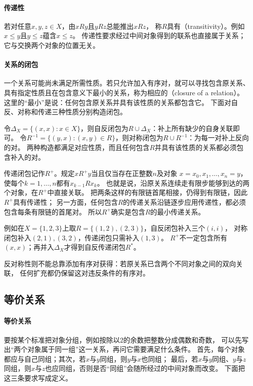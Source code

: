 \paragraph{传递性}
若对任意$x,y,z\in X$，由$xRy$且$yRz$总能推出$xRz$，
称$R$具有（transitivity）。例如$x\leq y$且$y\leq z$蕴含$x\leq z$。
传递性要求经过中间对象得到的联系也直接属于关系；它与交换两个对象的位置无关。

\paragraph{关系的闭包}
一个关系可能尚未满足所需性质。若只允许加入有序对，就可以寻找包含原关系、
具有指定性质且在包含意义下最小的关系，称为相应的（closure of a relation）。
这里的“最小”是说：任何包含原关系并具有该性质的关系都包含它。
下面对自反、对称和传递三种性质分别构造闭包。

令$\Delta_X=\{(x,x):x\in X\}$，则自反闭包为$R\cup\Delta_X$：补上所有缺少的自身关联即可。
令$R^{-1}=\{(y,x):(x,y)\in R\}$，则对称闭包为$R\cup R^{-1}$：为每一对补上反向的对。
两种构造都满足对应性质，而且任何包含$R$并具有该性质的关系都必须包含补入的对。

传递闭包记作$R^+$。规定$xR^+y$当且仅当存在正整数$n$及对象
$x=x_0,x_1,\ldots,x_n=y$，使每个$k=1,\ldots,n$都有$x_{k-1}Rx_k$。
也就是说，沿原关系连续走有限步能够到达的两个对象，在$R^+$中直接关联。
把两条这样的有限链首尾相接，仍得到有限链，因此$R^+$具有传递性；
另一方面，任何包含$R$的传递关系沿链逐步应用传递性，都必须包含每条有限链的首尾对。
所以$R^+$确实是包含$R$的最小传递关系。

例如在$X=\{1,2,3\}$上取$R=\{(1,2),(2,3)\}$，自反闭包补入三个$(i,i)$，
对称闭包补入$(2,1),(3,2)$，传递闭包只需补入$(1,3)$。
$R^+$不一定包含所有$(x,x)$；再并入$\Delta_X$才得到自反传递闭包$R^*$。

反对称性则不能总靠添加有序对获得：若原关系已含两个不同对象之间的双向关联，
任何扩充都仍保留这对违反条件的有序对。

\subsection{等价关系}
\label{sec:prelim-equivalence-relations}

\paragraph{等价关系}
要按某个标准把对象分组，例如按除以$2$的余数把整数分成偶数和奇数，
可以先写出“两个对象属于同一组”这一关系，再问它需要满足什么条件。
首先，每个对象都应与自己同组；其次，若$x$与$y$同组，则$y$与$x$也同组；
最后，若$x$与$y$同组、$y$与$z$同组，则$x$与$z$也应同组，否则是否“同组”会随所经过的中间对象而改变。
下面把这三条要求写成定义。

